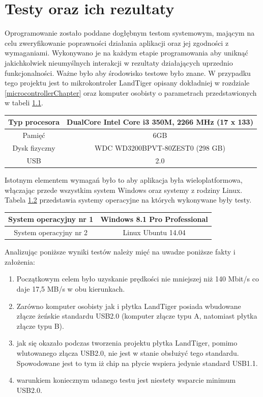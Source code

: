 \documentclass{BscUS}
\begin{document}
\chapter{Testy oraz ich rezultaty}
\label{resultsChapter}
\indent Oprogramowanie zostało poddane dogłębnym testom systemowym, mającym na celu zweryfikowanie poprawności działania aplikacji oraz jej zgodności z wymaganiami. Wykonywano je na każdym etapie programowania aby uniknąć jakichkolwiek nieumyślnych interakcji w rezultaty działających uprzednio funkcjonalności. Ważne było aby środowisko testowe było znane. W przypadku tego projektu jest to mikrokontroler LandTiger opisany dokładniej w rozdziale \ref{microcontrollerChapter} oraz komputer osobisty o parametrach przedstawionych w tabeli \ref{tbl:pcParameters}.
\begin{table}[H]
\centering
\begin{tabular}{|c|c|}
\hline
	\rowcolor[gray]{0.8}
	Typ procesora & DualCore Intel Core i3 350M, 2266 MHz (17 x 133) \\ \hline
	
	Pamięć & 6GB \\ \hline
	 \rowcolor[gray]{0.8}
	 Dysk fizyczny & WDC WD3200BPVT-80ZEST0  (298 GB) \\ \hline
	USB & 2.0 \\ \hline
\end{tabular}
\label{tbl:pcParameters}
\end{table}
\noindent Istotnym elementem wymagań było to aby aplikacja była wieloplatformowa, włączając przede wszystkim system Windows oraz systemy z rodziny Linux. Tabela \ref{tbl:operationalSystems} przedstawia systemy operacyjne na których wykonywane były testy.
\begin{table}[H]
\centering
\begin{tabular}{|c|c|}
\hline
	\rowcolor[gray]{0.8}
	System operacyjny nr 1 & Windows 8.1 Pro Professional \\ \hline
	System operacyjny nr 2  & Linux Ubuntu 14.04 \\ \hline
\end{tabular}
\label{tbl:operationalSystems}
\end{table}
\noindent Analizując poniższe wyniki testów należy mięć na uwadze poniższe fakty i założenia:
\begin{enumerate}
\item Początkowym celem było uzyskanie prędkości nie mniejszej niż 140 Mbit/s co daje 17,5 MB/s w obu kierunkach.
\item Zarówno komputer osobisty jak i płytka LandTiger posiada wbudowane złącze żeńskie standardu USB2.0 (komputer złącze typu A, natomiast płytka złącze typu B).
\item jak się okazało podczas tworzenia projektu płytka LandTiger, pomimo wlutowanego złącza USB2.0, nie jest w stanie obsłużyć tego standardu. Spowodowane jest to tym iż chip na płycie wspiera jedynie standard USB1.1.
\item warunkiem koniecznym udanego testu jest niestety wsparcie minimum USB2.0.
\end{enumerate}
\end{document}
